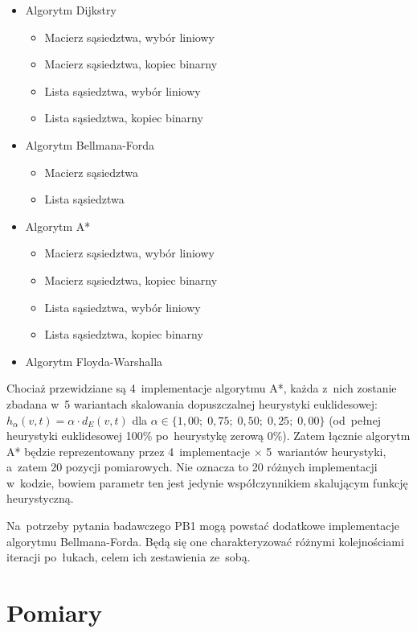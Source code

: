 \documentclass[11pt,a4paper,oneside]{report}
\begin{document}
\begin{itemize}
	\item Algorytm Dijkstry 
	\begin{itemize}
		\item Macierz sąsiedztwa, wybór liniowy
		\item Macierz sąsiedztwa, kopiec binarny
		\item Lista sąsiedztwa, wybór liniowy
		\item Lista sąsiedztwa, kopiec binarny
	\end{itemize}
	\item Algorytm Bellmana-Forda
	\begin{itemize}
		\item Macierz sąsiedztwa
		\item Lista sąsiedztwa
	\end{itemize}
	\item Algorytm A*
	\begin{itemize}
		\item Macierz sąsiedztwa, wybór liniowy
		\item Macierz sąsiedztwa, kopiec binarny
		\item Lista sąsiedztwa, wybór liniowy
		\item Lista sąsiedztwa, kopiec binarny
	\end{itemize}
	\item Algorytm Floyda-Warshalla
\end{itemize}

Chociaż przewidziane są 4~implementacje algorytmu A*, każda z~nich zostanie zbadana w~5 wariantach skalowania dopuszczalnej heurystyki euklidesowej: $h_\alpha(v, t) = \alpha \cdot d_E(v, t)$ dla $\alpha \in \{1{,}00; \; 0{,}75; \; 0{,}50; \; 0{,}25; \; 0{,}00\}$ (od~pełnej heurystyki euklidesowej 100\% po~heurystykę zerową 0\%). Zatem łącznie algorytm A* będzie reprezentowany przez 4~implementacje $\times$ 5~wariantów heurystyki, a~zatem 20 pozycji pomiarowych. Nie oznacza to 20 różnych implementacji w~kodzie, bowiem parametr ten jest jedynie współczynnikiem skalującym funkcję heurystyczną.

Na~potrzeby pytania badawczego PB1 mogą powstać dodatkowe implementacje algorytmu Bellmana-Forda. Będą się one charakteryzować różnymi kolejnościami iteracji po~łukach, celem ich zestawienia ze~sobą.


\newpage

\section{Pomiary}
\end{document}
